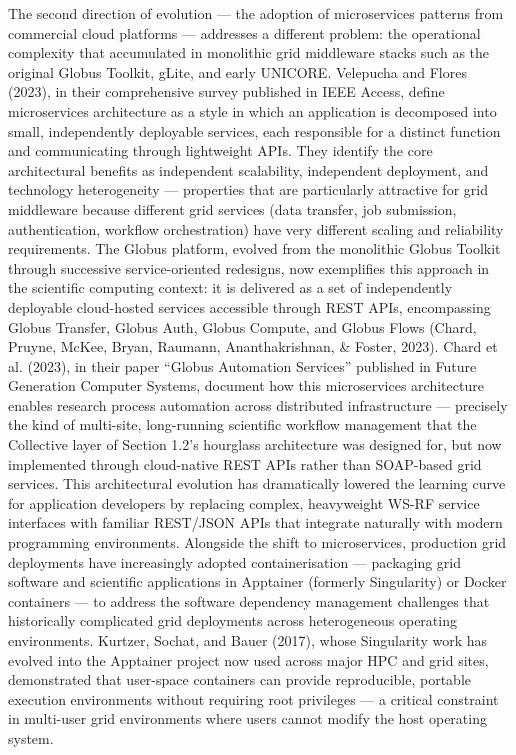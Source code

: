 \documentclass[12pt,a4paper]{report}
\begin{document}
The second direction of evolution — the adoption of microservices patterns from commercial cloud platforms — addresses a different problem: 
the operational complexity that accumulated in monolithic grid middleware stacks such as the original Globus Toolkit, gLite, and early UNICORE.
 Velepucha and Flores (2023), in their comprehensive survey published in IEEE Access, define microservices architecture as a style in which an 
 application is decomposed into small, independently deployable services, each responsible for a distinct function and communicating through 
 lightweight APIs. They identify the core architectural benefits as independent scalability, independent deployment, and technology heterogeneity 
 — properties that are particularly attractive for grid middleware because different grid services (data transfer, job submission, authentication, 
 workflow orchestration) have very different scaling and reliability requirements. The Globus platform, evolved from the monolithic Globus Toolkit 
 through successive service-oriented redesigns, now exemplifies this approach in the scientific computing context: it is delivered as a set of
  independently deployable cloud-hosted services accessible through REST APIs, encompassing Globus Transfer, Globus Auth, Globus Compute, and 
  Globus Flows (Chard, Pruyne, McKee, Bryan, Raumann, Ananthakrishnan, & Foster, 2023). Chard et al. (2023), in their paper “Globus Automation 
  Services” published in Future Generation Computer Systems, document how this microservices architecture enables research process automation 
  across distributed infrastructure — precisely the kind of multi-site, long-running scientific workflow management that the Collective layer 
  of Section 1.2’s hourglass architecture was designed for, but now implemented through cloud-native REST APIs rather than SOAP-based grid services. 
  This architectural evolution has dramatically lowered the learning curve for application developers by replacing complex, heavyweight WS-RF service 
  interfaces with familiar REST/JSON APIs that integrate naturally with modern programming environments. Alongside the shift to microservices,
   production grid deployments have increasingly adopted containerisation — packaging grid software and scientific applications in 
   Apptainer (formerly Singularity) or Docker containers — to address the software dependency management challenges that historically
    complicated grid deployments across heterogeneous operating environments. Kurtzer, Sochat, and Bauer (2017), whose Singularity work has
     evolved into the Apptainer project now used across major HPC and grid sites, demonstrated that user-space containers can provide reproducible,
      portable execution environments without requiring root privileges — a critical constraint in multi-user grid environments where users cannot 
      modify the host operating system.
\end{document}
